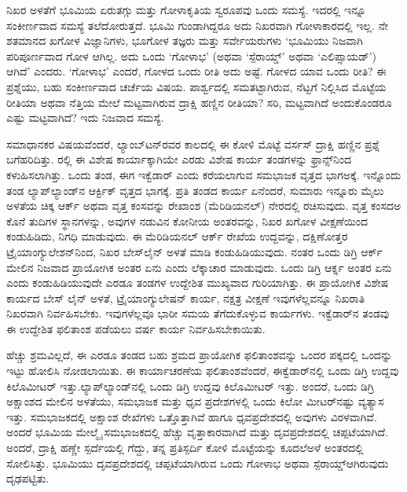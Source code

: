 ನಿಖರ ಅಳತೆಗೆ ಭೂಮಿಯ ಏರುತಗ್ಗು ಮತ್ತು ಗೋಳಾಕೃತಿಯ ಸ್ವರೂಪವು ಒಂದು ಸಮಸ್ಯೆ. ಇದರಲ್ಲಿ ಇನ್ನೂ ಸಂಕೀರ್ಣವಾದ ಸಮಸ್ಯೆ ತಲೆದೋರುತ್ತದೆ. ಭೂಮಿ ಗುಂಡಾಗಿದ್ದರೂ ಅದು ನಿಖರವಾಗಿ ಗೋಳಾಕಾರದಲ್ಲಿ ಇಲ್ಲ. ನೇ ಶತಮಾನದ ಖಗೋಳ ವಿಜ್ಞಾನಿಗಳು, ಭೂಗೋಳ ತಜ್ಞರು ಮತ್ತು ಸರ್ವೇಯರುಗಳು ‘ಭೂಮಿಯು ನಿಜವಾಗಿ ಪರಿಪೂರ್ಣವಾದ ಗೋಳ ಆಗಿಲ್ಲ. ಅದು ಒಂದು ‘ಗೋಳಾಭ’ (ಅಥವಾ ‘ಸ್ಪೆರಾಯ್ಡ್​’ ಅಥವಾ ‘ಎಲಿಪ್ಸಾಯಡ್​’) ಆಗಿದೆ’ ಎಂದರು. ‘ಗೋಳಾಭ’ ಎಂದರೆ, ಗೋಳದ ಒಂದು ರೀತಿ ಅದು ಅಷ್ಟೆ. ಗೋಳದ ಯಾವ ಒಂದು ರೀತಿ? ಈ ಪ್ರಶ್ನೆಯು, ಬಹು ಸಂಕೀರ್ಣವಾದ ಚರ್ಚೆಯ ವಿಷಯ. ಪಾರ್ಶ್ವದಲ್ಲಿ ಸಮತಟ್ಟಾಗಿರುವ, ನೆಟ್ಟಗೆ ನಿಲ್ಲಿಸಿದ ಮೊಟ್ಟೆಯ ರೀತಿಯಾ ಅಥವಾ ನೆತ್ತಿಯ ಮೇಲೆ ಮಟ್ಟವಾಗಿರುವ ದ್ರಾಕ್ಷಿ ಹಣ್ಣಿನ ರೀತಿಯಾ? ಸರಿ, ಮಟ್ಟವಾಗಿದೆ ಅಂದುಕೊಂಡರೂ ಎಷ್ಟು ಮಟ್ಟವಾಗಿದೆ? ಇದು ನಿಜವಾದ ಸಮಸ್ಯೆ.

ಸಮಾಧಾನಕರ ವಿಷಯವೆಂದರೆ, ಲ್ಯಾಂಬ್​ಟನ್​ರವರ ಕಾಲದಲ್ಲಿ ಈ ಕೋಳಿ ಮೊಟ್ಟೆ ವರ್ಸಸ್​ ದ್ರಾಕ್ಷಿ ಹಣ್ಣಿನ ಪ್ರಶ್ನೆ ಬಗೆಹರಿದಿತ್ತು. ರಲ್ಲಿ ಈ ವಿಶೇಷ ಕಾರ್ಯಾಕ್ಕಾಗಿಯೇ ಎರಡು ವಿಶೇಷ ಕಾರ್ಯ ತಂಡಗಳನ್ನು ಫ್ರಾನ್ಸ್​ನಿಂದ ಕಳುಹಿಸಲಾಗಿತ್ತು. ಒಂದು ತಂಡ, ಈಗ ಇಕ್ವೆಡಾರ್​ ಎಂದು ಕರೆಯಲಾಗುವ ಸಮಭಾಜಕ ವೃತ್ತದ ಭಾಗಅಕ್ಕೆ. ಇನ್ನೊಂದು ತಂಡ ಲ್ಯಾಪ್​ಲ್ಯಾಂಡ್​ನ ಆರ್ಕ್ಟಿಕ್​ ವೃತ್ತದ ಭಾಗಕ್ಕೆ. ಪ್ರತಿ ತಂಡದ ಕಾರ್ಯ ಏನೆಂದರೆ, ಸುಮಾರು ಇನ್ನೂರು ಮೈಲು ಅಳತೆಯ ಚಿಕ್ಕ ಆರ್ಕ್ ಅಥವಾ ವೃತ್ತ ಕಂಸವನ್ನು ರೇಖಾಂಶ (ಮೆರಿಡಿಯನಲ್​) ನೇರದಲ್ಲಿ ರಚಿಸುವುದು. ವೃತ್ತ ಕಂಸದಅ ಕೊನೆ ತುದಿಗಳ ಸ್ಥಾನಗಳನ್ನು, ಅವುಗಳ ನಡುವಿನ ಕೋನೀಯ ಅಂತರವನ್ನು, ನಿಖರ ಖಗೋಳ ವೀಕ್ಷಣೆಯಿಂದ ಕಂಡುಹಿಡಿದು, ನಿಗಧಿ ಮಾಡುವುದು. ಈ ಮೆರಿಡಿಯನಲ್​ ಆರ್ಕ್ ರೇಖೆಯ ಉದ್ದವನ್ನು, ದಕ್ಷಿಣೋತ್ತರ ಟ್ರೈಯಾಂಗ್ಯುಲೇಶನ್​ನಿಂದ, ನಿಖರ ಬೇಸ್​ಲೈನ್​ ಅಳತೆ ಮಾಡಿ ಕಂಡುಹಿಡಿಯುವುದು. ನಂತರ ಒಂದು ಡಿಗ್ರಿ ಆರ್ಕ್ ಮೇಲಿನ ನಿಜವಾದ ಪ್ರಾಯೋಗಿಕ ಅಂತರ ಏನು ಎಂದು ಲೆಕ್ಕಾಚಾರ ಮಾಡುವುದು. ಒಂದು ಡಿಗ್ರಿ ಆರ್ಕ್ನ ಅಂತರ ಏನು ಎಂದು ಕಂಡುಹಿಡಿಯುವುದೇ ಎರಡೂ ತಂಡಗಳ ಉದ್ದೇಶಿತ ಮುಖ್ಯವಾದ ಗುರಿಯಾಗಿತ್ತು. ಈ ಪ್ರಾಯೋಗಿಕ ವಿಶೇಷ ಕಾರ್ಯದ ಬೇಸ್​ ಲೈನ್​ ಅಳತೆ, ಟ್ರೈಯಾಂಗ್ಯುಲೇಷನ್​ ಕಾರ್ಯ, ನಕ್ಷತ್ರ ವೀಕ್ಷಣೆ ಇವುಗಳೆಲ್ಲವನ್ನೂ ನಿಖರಾತಿ ನಿಖರವಾಗಿ ನಿರ್ವಹಿಸಬೇಕು. ಇವುಗಳೆಲ್ಲವೂ ಭಾರೀ ಸಮಯ ತೆಗೆದುಕೊಳ್ಳುವ ಕಾರ್ಯಗಳು. ಇಕ್ವೆಡಾರ್​ನ ತಂಡವು ಈ ಉದ್ದೇಶಿತ ಫಲಿತಾಂಶ ಪಡೆಯಲು  ವರ್ಷ ಕಾರ್ಯ ನಿರ್ವಹಿಸಬೇಕಾಯಿತು.

ಹೆಚ್ಚು ಶ್ರಮವಿಲ್ಲದೆ, ಈ ಎರಡೂ ತಂಡದ ಬಹು ಶ್ರಮದ ಪ್ರಾಯೋಗಿಕ ಫಲಿತಾಂಶವನ್ನು ಒಂದರ ಪಕ್ಕದಲ್ಲಿ ಒಂದನ್ನು ಇಟ್ಟು ಹೋಲಿಸಿ ನೋಡಲಾಯಿತು. ಈ ಕಾರ್ಯಾಚರಣೆಯ ಫಲಿತಾಂಶವೆಂದರೆ, ಈಕ್ವೆಡಾರ್​ನಲ್ಲಿ ಒಂದು ಡಿಗ್ರಿ ಉದ್ದವು  ಕಿಲೊಮೀಟರ್​ ಇತ್ತು.\break ಲ್ಯಾಪ್​ಲ್ಯಾಂಡ್​ನಲ್ಲಿ ಒಂದು ಡಿಗ್ರಿ ಉದ್ದವು  ಕಿಲೊಮೀಟರ್​ ಇತ್ತು. ಅಂದರೆ, ಒಂದು ಡಿಗ್ರಿ ಅಕ್ಷಾಂಶದ ಮೇಲಿನ ಅಳತೆಯು, ಸಮಭಾಜಕ ಮತ್ತು ಧೃವ ಪ್ರದೇಶಗಳಲ್ಲಿ ಒಂದು ಕಿಲೋ ಮೀಟರ್​ನಷ್ಟು ವ್ಯತ್ಯಾಸ ಇತ್ತು. ಸಮಭಾಜಕದಲ್ಲಿ ಅಕ್ಷಾಂಶ ರೇಖೆಗಳು ಒತ್ತೊತ್ತಾಗಿವೆ ಹಾಗೂ ಧೃವಪ್ರದೇಶದಲ್ಲಿ ಅವುಗಳು ವಿರಳವಾಗಿವೆ. ಅಂದರೆ ಭೂಮಿಯ ಮೇಲ್ಮೈ ಸಮಭಾಜಕದಲ್ಲಿ ಹೆಚ್ಚು ವೃತ್ತಾಕಾರವಾಗಿದೆ ಮತ್ತು ದೃವಪ್ರದೇಶದಲ್ಲಿ ಚಪ್ಪಟೆಯಾಗಿದೆ. ಅಂದರೆ, ದ್ರಾಕ್ಷಿ ಹಣ್ಣೇ ಸ್ಪರ್ದೆಯಲ್ಲಿ ಗೆದ್ದು, ತನ್ನ ಪ್ರತಿಸ್ಪರ್ದಿ ಕೋಳಿ ಮೊಟ್ಟೆಯನ್ನು ಕೂದಲೆಅಳೆ ಅಂತರದಲ್ಲಿ ಸೋಲಿಸಿತ್ತು. ಭೂಮಿಯು ದೃವಪ್ರದೇಶದಲ್ಲಿ ಚಪ್ಪಟೆಯಾಗಿರುವ ಒಂದು ಗೋಳಾಭ ಅಥವಾ ಸ್ಪೆರಾಯ್ಡ್​ ಆಗಿರುವುದು ದೃಢಪಟ್ಟಿತು.

